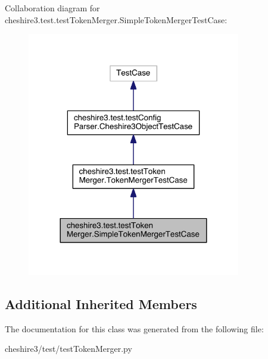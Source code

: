 Collaboration diagram for cheshire3.\-test.\-test\-Token\-Merger.\-Simple\-Token\-Merger\-Test\-Case\-:
\nopagebreak
\begin{figure}[H]
\begin{center}
\leavevmode
\includegraphics[width=264pt]{classcheshire3_1_1test_1_1test_token_merger_1_1_simple_token_merger_test_case__coll__graph}
\end{center}
\end{figure}
\subsection*{Additional Inherited Members}


The documentation for this class was generated from the following file\-:\begin{DoxyCompactItemize}
\item 
cheshire3/test/test\-Token\-Merger.\-py\end{DoxyCompactItemize}
